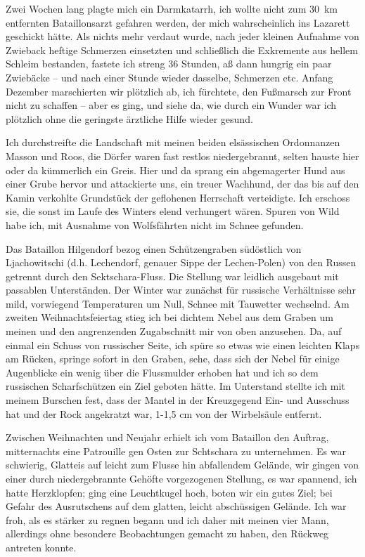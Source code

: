\documentclass[a5paper,pagesize,10pt,twoside=true]{scrbook}
\begin{document}
Zwei Wochen lang plagte mich ein Darmkatarrh, ich wollte nicht zum 30~km entfernten Bataillonsarzt gefahren werden, der mich wahrscheinlich ins Lazarett geschickt hätte. Als nichts mehr verdaut wurde, nach jeder kleinen Aufnahme von Zwieback heftige Schmerzen einsetzten und schließlich die Exkremente aus hellem Schleim bestanden, fastete ich streng 36 Stunden, aß dann hungrig ein paar Zwiebäcke -- und nach einer Stunde wieder dasselbe, Schmerzen etc. Anfang Dezember marschierten wir plötzlich ab, ich fürchtete, den Fußmarsch zur Front nicht zu schaffen -- aber es ging, und siehe da, wie durch ein Wunder war ich plötzlich ohne die geringste ärztliche Hilfe wieder gesund.

Ich durchstreifte die Landschaft mit meinen beiden elsässischen Ordonnanzen Masson und Roos, die Dörfer waren fast restlos niedergebrannt, selten hauste hier oder da kümmerlich ein Greis. Hier und da sprang ein abgemagerter Hund aus einer Grube hervor und attackierte uns, ein treuer Wachhund, der das bis auf den Kamin verkohlte Grundstück der geflohenen Herrschaft verteidigte. Ich erschoss sie, die sonst im Laufe des Winters elend verhungert wären. Spuren von Wild habe ich, mit Ausnahme von Wolfsfährten nicht im Schnee gefunden.

Das Bataillon Hilgendorf bezog einen Schützengraben südöstlich von Ljachowitschi (d.h. Lechendorf, genauer Sippe der Lechen-Polen) von den Russen getrennt durch den Sektschara-Fluss. Die Stellung war leidlich ausgebaut mit passablen Unterständen. Der Winter war zunächst für russische Verhältnisse sehr mild, vorwiegend Temperaturen um Null, Schnee mit Tauwetter wechselnd. Am zweiten Weihnachtsfeiertag stieg ich bei dichtem Nebel aus dem Graben um meinen und den angrenzenden Zugabschnitt mir von oben anzusehen. Da, auf einmal ein Schuss von russischer Seite, ich spüre so etwas wie einen leichten Klaps am Rücken, springe sofort in den Graben, sehe, dass sich der Nebel für einige Augenblicke ein wenig über die Flussmulder erhoben hat und ich so dem russischen Scharfschützen ein Ziel geboten hätte. Im Unterstand stellte ich mit meinem Burschen fest, dass der Mantel in der Kreuzgegend Ein- und Ausschuss hat und der Rock angekratzt war, 1-1,5 cm von der Wirbelsäule entfernt.

Zwischen Weihnachten und Neujahr erhielt ich vom Bataillon den Auftrag, mitternachts eine Patrouille gen Osten zur Schtschara zu unternehmen. Es war schwierig, Glatteis auf leicht zum Flusse hin abfallendem Gelände, wir gingen von einer durch niedergebrannte Gehöfte vorgezogenen Stellung, es war spannend, ich hatte Herzklopfen; ging eine Leuchtkugel hoch, boten wir ein gutes Ziel; bei Gefahr des Ausrutschens auf dem glatten, leicht abschüssigen Gelände. Ich war froh, als es stärker zu regnen begann und ich daher mit meinen vier Mann, allerdings ohne besondere Beobachtungen gemacht zu haben, den Rückweg antreten konnte.
\end{document}
